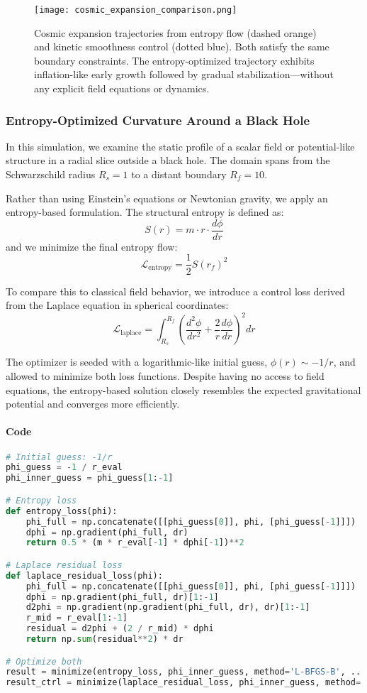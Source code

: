 \documentclass[12pt]{article}
\begin{document}
\begin{figure}[H]
\centering
\texttt{[image: cosmic\_expansion\_comparison.png]}
\caption{
Cosmic expansion trajectories from entropy flow (dashed orange) and kinetic smoothness control (dotted blue). Both satisfy the same boundary constraints. The entropy-optimized trajectory exhibits inflation-like early growth followed by gradual stabilization—without any explicit field equations or dynamics.
}
\end{figure}


\subsubsection{Entropy-Optimized Curvature Around a Black Hole}

In this simulation, we examine the static profile of a scalar field or potential-like structure in a radial slice outside a black hole. The domain spans from the Schwarzschild radius \( R_s = 1 \) to a distant boundary \( R_f = 10 \).

Rather than using Einstein's equations or Newtonian gravity, we apply an entropy-based formulation. The structural entropy is defined as:
\[
S(r) = m \cdot r \cdot \frac{d\phi}{dr}
\]
and we minimize the final entropy flow:
\[
\mathcal{L}_{\text{entropy}} = \frac{1}{2} S(r_f)^2
\]

To compare this to classical field behavior, we introduce a control loss derived from the Laplace equation in spherical coordinates:
\[
\mathcal{L}_{\text{laplace}} = \int_{R_s}^{R_f} \left( \frac{d^2\phi}{dr^2} + \frac{2}{r} \frac{d\phi}{dr} \right)^2 dr
\]

The optimizer is seeded with a logarithmic-like initial guess, \( \phi(r) \sim -1/r \), and allowed to minimize both loss functions. Despite having no access to field equations, the entropy-based solution closely resembles the expected gravitational potential and converges more efficiently.

\paragraph*{Code}\mbox{}
\begin{lstlisting}[language=Python]
# Initial guess: -1/r
phi_guess = -1 / r_eval
phi_inner_guess = phi_guess[1:-1]

# Entropy loss
def entropy_loss(phi):
    phi_full = np.concatenate([[phi_guess[0]], phi, [phi_guess[-1]]])
    dphi = np.gradient(phi_full, dr)
    return 0.5 * (m * r_eval[-1] * dphi[-1])**2

# Laplace residual loss
def laplace_residual_loss(phi):
    phi_full = np.concatenate([[phi_guess[0]], phi, [phi_guess[-1]]])
    dphi = np.gradient(phi_full, dr)[1:-1]
    d2phi = np.gradient(np.gradient(phi_full, dr), dr)[1:-1]
    r_mid = r_eval[1:-1]
    residual = d2phi + (2 / r_mid) * dphi
    return np.sum(residual**2) * dr

# Optimize both
result = minimize(entropy_loss, phi_inner_guess, method='L-BFGS-B', ...)
result_ctrl = minimize(laplace_residual_loss, phi_inner_guess, method='L-BFGS-B', ...)
\end{lstlisting}
\end{document}
